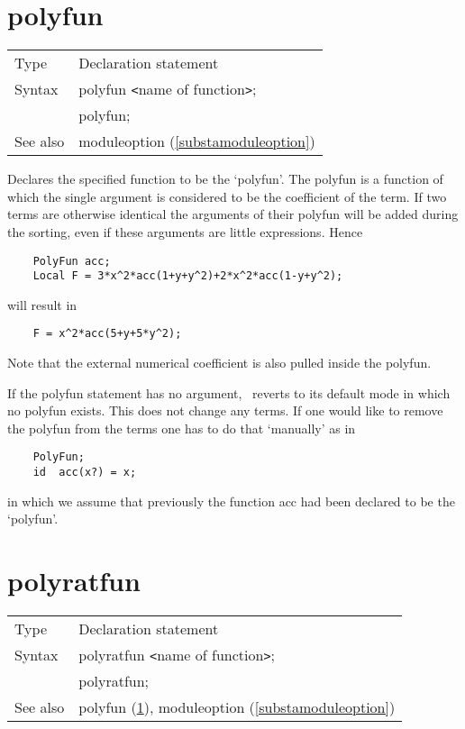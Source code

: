 
\section{polyfun}
\label{substapolyfun}

\noindent \begin{tabular}{ll}
Type & Declaration statement\\
Syntax & polyfun {\tt<}name of function{\tt>}; \\
       & polyfun;
\\ See also & moduleoption (\ref{substamoduleoption})
\end{tabular}\vspace{4mm}

\noindent Declares the specified function to be the 
`polyfun'. The polyfun is a function of which the single 
argument is considered to be the 
coefficient of the term. If two terms are otherwise 
identical the arguments of their polyfun will be added during the sorting, 
even if these arguments are little expressions. Hence
\begin{verbatim}
    PolyFun acc;
    Local F = 3*x^2*acc(1+y+y^2)+2*x^2*acc(1-y+y^2);
\end{verbatim}
will result in
\begin{verbatim}
    F = x^2*acc(5+y+5*y^2);
\end{verbatim}
Note that the external numerical coefficient is also 
pulled inside the polyfun.

\noindent If the polyfun statement has no argument, \FORM\ reverts to its 
default mode in which no polyfun exists. This does not change any terms. If 
one would like to remove the polyfun from the terms one has to do that 
`manually' as in
\begin{verbatim}
    PolyFun;
    id  acc(x?) = x;
\end{verbatim}
in which we assume that previously the function acc had been declared to be 
the `polyfun'. \vspace{10mm}


\section{polyratfun}
\label{substapolyratfun}

\noindent \begin{tabular}{ll}
Type & Declaration statement\\
Syntax & polyratfun {\tt<}name of function{\tt>}; \\
       & polyratfun;
\\ See also & polyfun (\ref{substapolyfun}),
			  moduleoption (\ref{substamoduleoption})
\end{tabular}\vspace{4mm}

